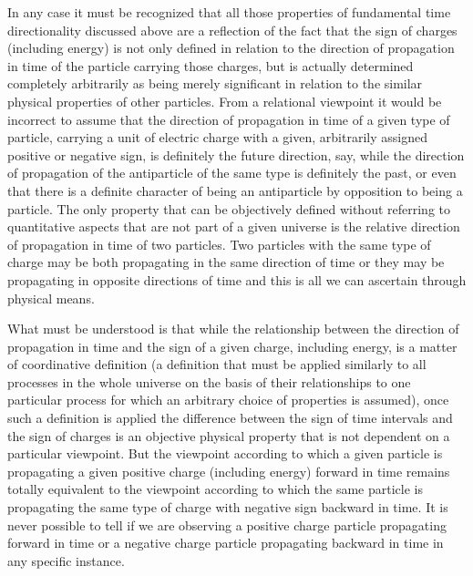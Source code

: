 \documentclass[notitlepage,12pt]{report}
\begin{document}
In any case it must be recognized that all those properties of fundamental time directionality discussed above are a reflection of the fact that the sign of charges (including energy) is not only defined in relation to the direction of propagation in time of the particle carrying those charges, but is actually determined completely arbitrarily as being merely significant in relation to the similar physical properties of other particles. From a relational viewpoint it would be incorrect to assume that the direction of propagation in time of a given type of particle, carrying a unit of electric charge with a given, arbitrarily assigned positive or negative sign, is definitely the future direction, say, while the direction of propagation of the antiparticle of the same type is definitely the past, or even that there is a definite character of being an antiparticle by opposition to being a particle. The only property that can be objectively defined without referring to quantitative aspects that are not part of a given universe is the relative direction of propagation in time of two particles. Two particles with the same type of charge may be both propagating in the same direction of time or they may be propagating in opposite directions of time and this is all we can ascertain through physical means.

What must be understood is that while the relationship between the direction of propagation in time and the sign of a given charge, including energy, is a matter of coordinative definition (a definition that must be applied similarly to all processes in the whole universe on the basis of their relationships to one particular process for which an arbitrary choice of properties is assumed), once such a definition is applied the difference between the sign of time intervals and the sign of charges is an objective physical property that is not dependent on a particular viewpoint. But the viewpoint according to which a given particle is propagating a given positive charge (including energy) forward in time remains totally equivalent to the viewpoint according to which the same particle is propagating the same type of charge with negative sign backward in time. It is never possible to tell if we are observing a positive charge particle propagating forward in time or a negative charge particle propagating backward in time in any specific instance.
\end{document}
